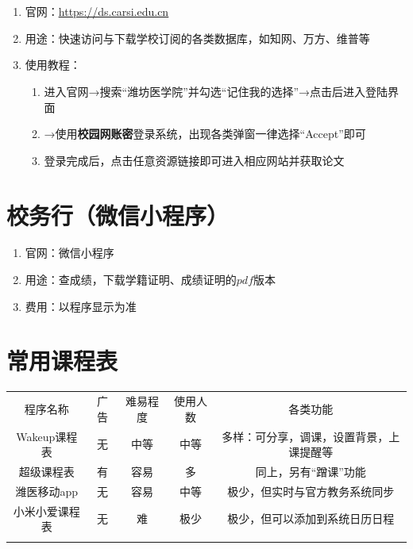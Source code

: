 \section[CARSI系统]{\textbf{}}
\label{carsi_system}
\begin{enumerate}
    \item 官网：\uline{\href{https://ds.carsi.edu.cn}{https://ds.carsi.edu.cn}}
    \item 用途：快速访问与下载学校订阅的各类数据库，如知网、万方、维普等
    \item 使用教程：
    \begin{enumerate}
        \item 进入官网→搜索“潍坊医学院”并勾选“记住我的选择”→点击后进入登陆界面\footnotemark
        \item →使用\textbf{校园网账密}登录系统，出现各类弹窗一律选择“Accept”即可
        \item 登录完成后，点击任意资源链接即可进入相应网站并获取论文
    \end{enumerate}
\end{enumerate}

\section[校务行（微信小程序）]{校务行（微信小程序）}
\begin{enumerate}
    \item 官网：微信小程序
    \item 用途：查成绩，下载学籍证明、成绩证明的$pdf$版本
    \item 费用：以程序显示为准
\end{enumerate}

\section[常用课程表]{常用课程表}
\begin{table}[!ht]
    \centering
    \begin{tabular}{|c|c|c|c|c|}
        \Xhline{1.2pt}
        程序名称      & 广告 & 难易程度 & 使用人数 & 各类功能              \\
        \Xhline{1.2pt}
        Wakeup课程表 & 无  & 中等   & 中等   & 多样：可分享，调课，设置背景，上课提醒等 \\
        \hline
        超级课程表     & 有  & 容易   & 多    & 同上，另有“蹭课”功能       \\
        \hline
        潍医移动app   & 无  & 容易   & 中等   & 极少，但实时与官方教务系统同步   \\
        \hline
        小米小爱课程表   & 无  & 难    & 极少   & 极少，但可以添加到系统日历日程   \\
        \Xhline{1.2pt}
    \end{tabular}
\end{table}

